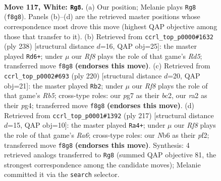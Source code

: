 \documentclass[11pt]{article}
\begin{document}
\clearpage

\begin{figure}[p]\centering
\begin{subfigure}{0.46\textwidth}\centering
\resizebox{\linewidth}{!}{%
\newchessgame
\chessboard[
  setfen={5R2/6p1/1N3p2/5k1p/7P/6PK/r7/8 w - - 58 117},
  showmover=false,
  pgfstyle=straightmove, color=movearrow, markmove={f8-g8}
]}
\caption{}
\end{subfigure}\hfill
\begin{subfigure}{0.46\textwidth}\centering
\resizebox{\linewidth}{!}{%
\newchessgame
\chessboard[
  setfen={8/8/6k1/3R1p1p/5P1P/6PK/r7/8 w - - 85 120},
  showmover=false,
  pgfstyle=straightmove, color=movearrow, markmove={d5-d6}
]}
\caption{}
\end{subfigure}
\\[4pt]
\begin{subfigure}{0.46\textwidth}\centering
\resizebox{\linewidth}{!}{%
\newchessgame
\chessboard[
  setfen={8/8/8/1R4pk/6p1/5pP1/2b4P/6K1 w - - 32 111},
  showmover=false,
  pgfstyle=straightmove, color=movearrow, markmove={b5-b2}
]}
\caption{}
\end{subfigure}\hfill
\begin{subfigure}{0.46\textwidth}\centering
\resizebox{\linewidth}{!}{%
\newchessgame
\chessboard[
  setfen={1R6/5pk1/6p1/7p/5K1P/r5P1/5P2/8 b - - 36 109},
  showmover=false,
  pgfstyle=straightmove, color=movearrow, markmove={a3-a4}
]}
\caption{}
\end{subfigure}
\caption{\textbf{Move 117, White: \texttt{Rg8}.} (a) Our position; Melanie plays \texttt{Rg8} (\texttt{f8g8}). Panels (b)--(d) are the retrieved master positions whose correspondence most drove this move (highest QAP objective among those that transfer to it). (b) Retrieved from \texttt{ccrl\_top\_p0000\#1632} (ply 238) [structural distance $d$=16, QAP obj=25]: the master played \texttt{Rd6+}; under $\mu$ our \emph{Rf8} plays the role of that game's \emph{Rd5}; transferred move \texttt{f8g8} \textbf{(endorses this move)}. (c) Retrieved from \texttt{ccrl\_top\_p0002\#693} (ply 220) [structural distance $d$=20, QAP obj=21]: the master played \texttt{Rb2}; under $\mu$ our \emph{Rf8} plays the role of that game's \emph{Rb5}; cross-type roles: our \emph{p}g7 as their \emph{b}c2, our \emph{r}a2 as their \emph{p}g4; transferred move \texttt{f8g8} \textbf{(endorses this move)}. (d) Retrieved from \texttt{ccrl\_top\_p0001\#1392} (ply 217) [structural distance $d$=15, QAP obj=10]: the master played \texttt{Ra4+}; under $\mu$ our \emph{Rf8} plays the role of that game's \emph{Ra6}; cross-type roles: our \emph{N}b6 as their \emph{p}f2; transferred move \texttt{f8g8} \textbf{(endorses this move)}. Synthesis: 4 retrieved analogs transferred to \texttt{Rg8} (summed QAP objective 81, the strongest correspondence among the candidate moves); Melanie committed it via the \texttt{search} selector.}
\label{fig:thought-m232}
\end{figure}
\end{document}
